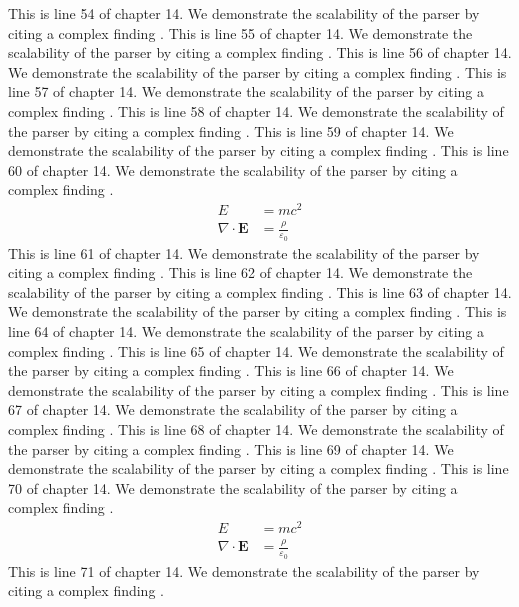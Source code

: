 This is line 54 of chapter 14. We demonstrate the scalability of the parser by citing a complex finding \cite{ref14_54}.
This is line 55 of chapter 14. We demonstrate the scalability of the parser by citing a complex finding \cite{ref14_55}.
This is line 56 of chapter 14. We demonstrate the scalability of the parser by citing a complex finding \cite{ref14_56}.
This is line 57 of chapter 14. We demonstrate the scalability of the parser by citing a complex finding \cite{ref14_57}.
This is line 58 of chapter 14. We demonstrate the scalability of the parser by citing a complex finding \cite{ref14_58}.
This is line 59 of chapter 14. We demonstrate the scalability of the parser by citing a complex finding \cite{ref14_59}.
This is line 60 of chapter 14. We demonstrate the scalability of the parser by citing a complex finding \cite{ref14_60}.
\begin{align*}
  E &= mc^2 \\
  \nabla \cdot \mathbf{E} &= \frac{\rho}{\varepsilon_0}
\end{align*}
This is line 61 of chapter 14. We demonstrate the scalability of the parser by citing a complex finding \cite{ref14_61}.
This is line 62 of chapter 14. We demonstrate the scalability of the parser by citing a complex finding \cite{ref14_62}.
This is line 63 of chapter 14. We demonstrate the scalability of the parser by citing a complex finding \cite{ref14_63}.
This is line 64 of chapter 14. We demonstrate the scalability of the parser by citing a complex finding \cite{ref14_64}.
This is line 65 of chapter 14. We demonstrate the scalability of the parser by citing a complex finding \cite{ref14_65}.
This is line 66 of chapter 14. We demonstrate the scalability of the parser by citing a complex finding \cite{ref14_66}.
This is line 67 of chapter 14. We demonstrate the scalability of the parser by citing a complex finding \cite{ref14_67}.
This is line 68 of chapter 14. We demonstrate the scalability of the parser by citing a complex finding \cite{ref14_68}.
This is line 69 of chapter 14. We demonstrate the scalability of the parser by citing a complex finding \cite{ref14_69}.
This is line 70 of chapter 14. We demonstrate the scalability of the parser by citing a complex finding \cite{ref14_70}.
\begin{align*}
  E &= mc^2 \\
  \nabla \cdot \mathbf{E} &= \frac{\rho}{\varepsilon_0}
\end{align*}
This is line 71 of chapter 14. We demonstrate the scalability of the parser by citing a complex finding \cite{ref14_71}.

